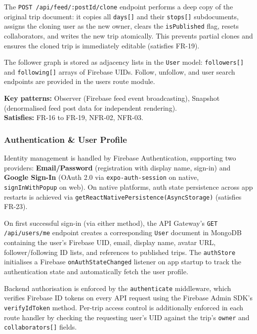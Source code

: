 \documentclass[12pt, a4paper]{article}
\begin{document}
The \texttt{POST /api/feed/:postId/clone} endpoint performs a deep copy of the original trip document: it copies all \texttt{days[]} and their \texttt{stops[]} subdocuments, assigns the cloning user as the new owner, clears the \texttt{isPublished} flag, resets collaborators, and writes the new trip atomically. This prevents partial clones and ensures the cloned trip is immediately editable (satisfies FR-19).

The follower graph is stored as adjacency lists in the \texttt{User} model: \texttt{followers[]} and \texttt{following[]} arrays of Firebase UIDs. Follow, unfollow, and user search endpoints are provided in the users route module.

\begin{tcolorbox}[notebox]
  \textbf{Key patterns:} Observer (Firebase feed event broadcasting), Snapshot (denormalised feed post data for independent rendering).\\[2pt]
  \textbf{Satisfies:} FR-16 to FR-19, NFR-02, NFR-03.
\end{tcolorbox}

\subsubsection{Authentication \& User Profile}

Identity management is handled by Firebase Authentication, supporting two providers: \textbf{Email/Password} (registration with display name, sign-in) and \textbf{Google Sign-In} (OAuth 2.0 via \texttt{expo-auth-session} on native, \texttt{signInWithPopup} on web). On native platforms, auth state persistence across app restarts is achieved via \texttt{getReactNativePersistence(AsyncStorage)} (satisfies FR-23).

On first successful sign-in (via either method), the API Gateway's \texttt{GET /api/users/me} endpoint creates a corresponding \texttt{User} document in MongoDB containing the user's Firebase UID, email, display name, avatar URL, follower/following ID lists, and references to published trips. The \texttt{authStore} initialises a Firebase \texttt{onAuthStateChanged} listener on app startup to track the authentication state and automatically fetch the user profile.

Backend authorisation is enforced by the \texttt{authenticate} middleware, which verifies Firebase ID tokens on every API request using the Firebase Admin SDK's \texttt{verifyIdToken} method. Per-trip access control is additionally enforced in each route handler by checking the requesting user's UID against the trip's \texttt{owner} and \texttt{collaborators[]} fields.
\end{document}
